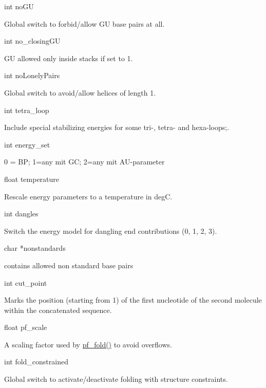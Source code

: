 \begin{DoxyVerb}
int noGU
\end{DoxyVerb}
 Global switch to forbid/allow GU base pairs at all. 

\begin{DoxyVerb}
int no_closingGU
\end{DoxyVerb}
 GU allowed only inside stacks if set to 1. 

\begin{DoxyVerb}
int noLonelyPairs
\end{DoxyVerb}
 Global switch to avoid/allow helices of length 1. 

\begin{DoxyVerb}
int tetra_loop
\end{DoxyVerb}
 Include special stabilizing energies for some tri-\/, tetra-\/ and hexa-\/loops;. 

\begin{DoxyVerb}
int energy_set
\end{DoxyVerb}
 0 = BP; 1=any mit GC; 2=any mit AU-\/parameter 

\begin{DoxyVerb}
float temperature
\end{DoxyVerb}
 Rescale energy parameters to a temperature in degC. 

\begin{DoxyVerb}
int dangles
\end{DoxyVerb}
 Switch the energy model for dangling end contributions (0, 1, 2, 3). 

\begin{DoxyVerb}
char *nonstandards
\end{DoxyVerb}
 contains allowed non standard base pairs 

\begin{DoxyVerb}
int cut_point
\end{DoxyVerb}
 Marks the position (starting from 1) of the first nucleotide of the second molecule within the concatenated sequence. 

\begin{DoxyVerb}
float pf_scale
\end{DoxyVerb}
 A scaling factor used by \hyperlink{part__func_8h_adc3db3d98742427e7001a7fd36ef28c2}{pf\_\-fold()} to avoid overflows. 

\begin{DoxyVerb}
int fold_constrained
\end{DoxyVerb}
 Global switch to activate/deactivate folding with structure constraints. 

